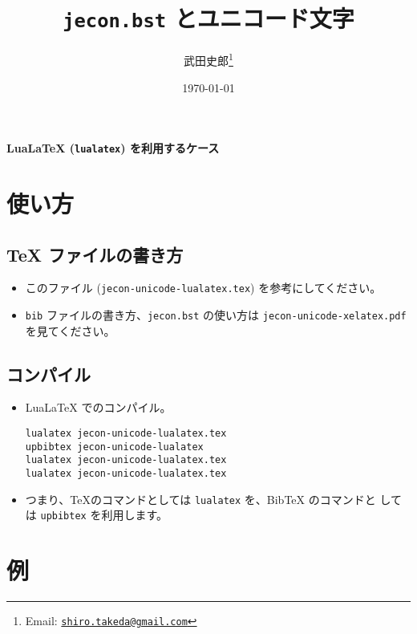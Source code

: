 \documentclass{ltjsarticle}
\title{\textbf{\texttt{jecon.bst} とユニコード文字}}
\author{武田史郎\thanks{Email: \texttt{\href{mailto:shiro.takeda@gmail.com}{shiro.takeda@gmail.com}}}}
\date{\today}
\begin{document}
\begin{flushleft}
 {\Large \textbf{LuaLaTeX (\texttt{lualatex}) を利用するケース}}
\end{flushleft}

\vspace{1em}

\section{使い方}

\subsection{TeX ファイルの書き方}

\begin{itemize}
 \item このファイル (\texttt{jecon-unicode-lualatex.tex}) を参考にしてください。
 \item \texttt{bib} ファイルの書き方、\texttt{jecon.bst} の使い方は
       \texttt{jecon-unicode-xelatex.pdf} を見てください。
\end{itemize}

\subsection{コンパイル}

\begin{itemize}
 \item LuaLaTeX でのコンパイル。
\begin{verbatim}
lualatex jecon-unicode-lualatex.tex
upbibtex jecon-unicode-lualatex
lualatex jecon-unicode-lualatex.tex               
lualatex jecon-unicode-lualatex.tex
\end{verbatim}
 \item つまり、\TeX のコマンドとしては \texttt{lualatex} を、BibTeX のコマンドと
       しては \texttt{upbibtex} を利用します。
\end{itemize}

\section{例}



\nocite{*}



%

\end{document}
